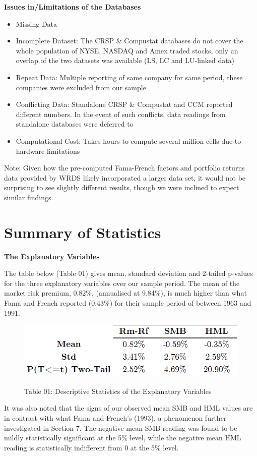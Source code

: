 \documentclass[12pt]{article}
\begin{document}
\noindent \textbf{Issues in/Limitations of the Databases}
\begin{itemize}
	\item Missing Data
	\item Incomplete Dataset: The CRSP \& Compustat databases do not cover the whole population of NYSE, NASDAQ and Amex traded stocks, only an overlap of the two datasets was available (LS, LC and LU-linked data)
	\item Repeat Data: Multiple reporting of same company for same period, these companies were excluded from our sample
	\item Conflicting Data: Standalone CRSP \& Compustat and CCM reported different numbers. In the event of such conflicts, data readings from standalone databases were deferred to
	\item Computational Cost: Takes hours to compute several million cells due to hardware limitations
\end{itemize}
\noindent Note: Given how the pre-computed Fama-French factors and portfolio returns data provided by WRDS likely incorporated a larger data set, it would not be surprising to see slightly different results, though we were inclined to expect similar findings. 

\newpage

\section{Summary of Statistics}
\textbf{The Explanatory Variables}

\noindent The table below (Table 01) gives mean, standard deviation and 2-tailed p-values for the three explanatory variables over our sample period. The mean of the market risk premium, 0.82\%, (annualised at 9.84\%), is much higher than what Fama and French reported (0.43\%) for their sample period of between 1963 and 1991. 


\begin{figure}[h]
	\centering
	\caption*{Table 01: Descriptive Statistics of the Explanatory Variables}
	\includegraphics[width=0.46\linewidth,trim=4 4 4 4,clip]{A1.png}
	\label{fig:label}
\end{figure}

\noindent It was also noted that the signs of our observed mean SMB and HML values are in contrast with what Fama and French's (1993), a phenomenon further investigated in Section 7. The negative mean SMB reading was found to be mildly statistically significant at the 5\% level, while the negative mean HML reading is statistically indifferent from 0 at the 5\% level. \\
\end{document}
